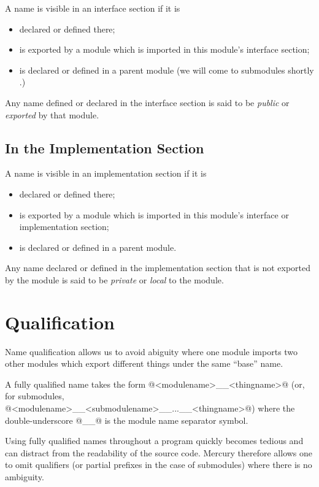 A name is visible in an interface section if it is
\begin{itemize}
\item declared or defined there;
\item is exported by a module which is imported in this
  module's interface section;
\item is declared or defined in a parent module (we will come
  to submodules shortly \XXX{}.)
\end{itemize}

Any name defined or declared in the interface section is
said to be \emph{public} or \emph{exported} by that module.

\subsection{In the Implementation Section}

A name is visible in an implementation section if it is
\begin{itemize}
\item declared or defined there;
\item is exported by a module which is imported in this
  module's interface or implementation section;
\item is declared or defined in a parent module.
\end{itemize}

Any name declared or defined in the implementation section
that is not exported by the module is said to be \emph{private}
or \emph{local} to the module.

\section{Qualification}

Name qualification allows us to avoid abiguity where one
module imports two other modules which export different things
under the same ``base'' name.

A fully qualified name takes the form @<modulename>__<thingname>@
(or, for submodules, @<modulename>__<submodulename>__...__<thingname>@)
where the double-underscore @__@ is the module name separator symbol.

Using fully qualified names throughout a program quickly
becomes tedious and can distract from the readability of the
source code.  Mercury therefore allows one to omit qualifiers
(or partial prefixes in the case of submodules) where there is
no ambiguity.

